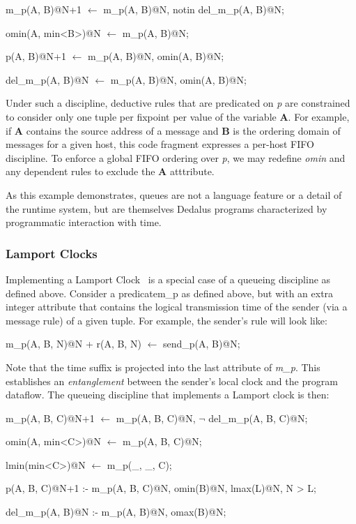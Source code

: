 \begin{Dedalus}
m\_p(A, B)@N+1 \(\leftarrow\)
  m\_p(A, B)@N,
  notin del\_m\_p(A, B)@N;

omin(A, min<B>)@N \(\leftarrow\)
  m\_p(A, B)@N;

p(A, B)@N+1 \(\leftarrow\)
  m\_p(A, B)@N,
  omin(A, B)@N;

del\_m\_p(A, B)@N \(\leftarrow\)
  m\_p(A, B)@N,
  omin(A, B)@N;
\end{Dedalus}

Under such a discipline, deductive rules that are predicated on \emph{p} are constrained to consider only one tuple per fixpoint
per value of the variable \textbf{A}.  For example, if \textbf{A} contains the source address of a message and \textbf{B} is the ordering
domain of messages for a given host, this code fragment
expresses a per-host FIFO discipline.  To enforce a global FIFO ordering over \emph{p}, we may redefine \emph{omin} and any 
dependent rules to exclude the \textbf{A} atttribute.

As this example demonstrates, queues are not a language feature or a detail of the runtime system, but are themselves Dedalus programs
characterized by programmatic interaction with time.



\subsubsection{Lamport Clocks}

Implementing a Lamport Clock~\cite{timeclocks} is a special case of a queueing discipline as defined above.
Consider a predicate{m\_p} as defined above, but with an extra integer attribute that contains the logical transmission
time of the sender (via a message rule) of a given tuple.  For example, the sender's rule will look like: 

\begin{Dedalus}
m\_p(A, B, N)@N + r(A, B, N) \(\leftarrow\)
  send\_p(A, B)@N;
\end{Dedalus}

Note that the time suffix is projected into the last attribute of \emph{m\_p}.  This establishes an \emph{entanglement} between
the sender's local clock and the program dataflow.  The queueing discipline that implements a
Lamport clock is then:

\begin{Dedalus}

m\_p(A, B, C)@N+1 \(\leftarrow\)
  m\_p(A, B, C)@N,
  \(\lnot\) del\_m\_p(A, B, C)@N;

omin(A, min<C>)@N \(\leftarrow\)
  m\_p(A, B, C)@N;

lmin(min<C>)@N \(\leftarrow\)
  m\_p(_, _, C);

p(A, B, C)@N+1 :-
  m\_p(A, B, C)@N,
  omin(B)@N,
  lmax(L)@N,
  N > L;

del\_m\_p(A, B)@N :-
  m\_p(A, B)@N,
  omax(B)@N;
  
\end{Dedalus}

